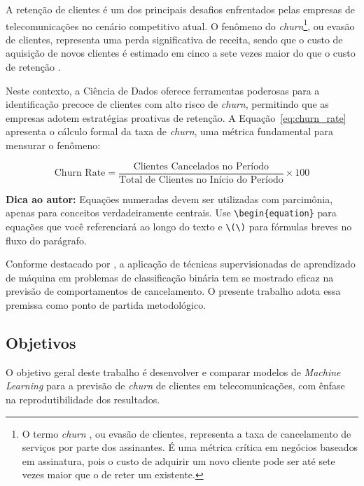 \documentclass[
    article,
    12pt,
    oneside,
    a4paper,
    english,
    brazilian
    ]{abntex2}
\numberwithin{equation}{section}
\newenvironment{dica}{%
    \par\medskip
    \color{blue!60!black}\small\itshape
}{%
    \par\medskip
}
\begin{document}
A retenção de clientes é um dos principais desafios enfrentados pelas empresas de telecomunicações no cenário competitivo atual. O fenômeno do \textit{churn}\footnote{O termo \textit{churn} , ou evasão de clientes, representa a taxa de cancelamento de serviços por parte dos assinantes. É uma métrica crítica em negócios baseados em assinatura, pois o custo de adquirir um novo cliente pode ser até sete vezes maior que o de reter um existente.}, ou evasão de clientes, representa uma perda significativa de receita, sendo que o custo de aquisição de novos clientes é estimado em cinco a sete vezes maior do que o custo de retenção \cite{provost2013}.

Neste contexto, a Ciência de Dados oferece ferramentas poderosas para a identificação precoce de clientes com alto risco de \textit{churn}, permitindo que as empresas adotem estratégias proativas de retenção. A Equação~\ref{eq:churn_rate} apresenta o cálculo formal da taxa de \textit{churn}, uma métrica fundamental para mensurar o fenômeno:

\begin{equation}
    \text{Churn Rate} = \frac{\text{Clientes Cancelados no Período}}{\text{Total de Clientes no Início do Período}} \times 100
    \label{eq:churn_rate}
\end{equation}

\begin{dica}
\noindent\textbf{Dica ao autor:} Equações numeradas devem ser utilizadas com parcimônia, apenas para conceitos verdadeiramente centrais. Use \texttt{\textbackslash begin\{equation\}} para equações que você referenciará ao longo do texto e \texttt{\textbackslash (\textbackslash)} para fórmulas breves no fluxo do parágrafo.
\end{dica}

Conforme destacado por , a aplicação de técnicas supervisionadas de aprendizado de máquina em problemas de classificação binária tem se mostrado eficaz na previsão de comportamentos de cancelamento. O presente trabalho adota essa premissa como ponto de partida metodológico.

\subsection{Objetivos}

O objetivo geral deste trabalho é desenvolver e comparar modelos de \textit{Machine Learning} para a previsão de \textit{churn} de clientes em telecomunicações, com ênfase na reprodutibilidade dos resultados.
\end{document}
